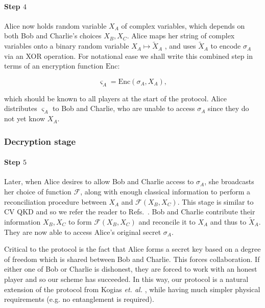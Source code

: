 \paragraph{Step $4$} Alice now holds random variable $X_A$ of complex variables, which depends on both Bob and Charlie's choices $X_B, X_C$. Alice maps her string of complex variables onto a binary random variable $X_A \mapsto \tilde{X}_A$ \cite{Diamanti2015}, and uses $\tilde{X}_A$ to encode $\sigma_A$ via an XOR operation. For notational ease we shall write this combined step in terms of an encryption function $\text{Enc}$:  %

\begin{equation}
\varsigma_A = \text{Enc}\left(\sigma_A, X_A\right),
\end{equation} %

\noindent which should be known to all players at the start of the protocol. Alice distributes $\varsigma_A$ to Bob and Charlie, who are unable to access $\sigma_A$ since they do not yet know $X_A$.

\subsubsection*{Decryption stage}

\paragraph{Step $5$} Later, when Alice desires to allow Bob and Charlie access to $\sigma_A$, she broadcasts her choice of function $\mathcal{F}$, along with enough classical information to perform a reconciliation procedure between $X_A$ and $\mathcal{F}\left(X_B, X_C\right)$. This stage is similar to CV QKD and so we refer the reader to Refs.~\cite{Diamanti2015, Laudenbach2017}. Bob and Charlie contribute their information $X_B, X_C$ to form $\mathcal{F}\left(X_B, X_C\right)$ and reconcile it to $X_A$ and thus to $\tilde{X}_A$. They are now able to access Alice's original secret $\sigma_A$.

Critical to the protocol is the fact that Alice forms a secret key based on a degree of freedom which is shared between Bob and Charlie. This forces collaboration. If either one of Bob or Charlie is dishonest, they are forced to work with an honest player and so our scheme has succeeded. In this way, our protocol is a natural extension of the protocol from Kogias \emph{et. al.} \cite{Kogias2017}, while having much simpler physical requirements (e.g. no entanglement is required).



